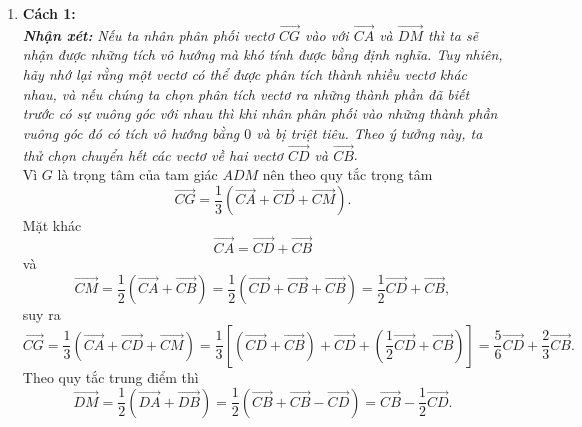 \begin{vd}
{\begin{enumerate}
			      \textbf{Cách 2:} Đặt hệ trục tọa độ $ Oxy $ vào hình vuông $ ABCD $ sao cho $ O\equiv D $, $ DC $ nằm trên tia $ Ox $ và $ DA $ nằm trên tia $ Oy $. Khi đó ta có $ D(0;0) $, $ A(0;a) $, $ B(a;a) $, $ C(a;0) $. Dễ dàng tính được $ \overrightarrow{AB}=(a;0) $; $ \overrightarrow{AD}=(0;-a) $; $ \overrightarrow{BD}=(-a;-a) $; $ \overrightarrow{BC}=(0;-a) $. Suy ra $ \overrightarrow{AB}+\overrightarrow{AD}=(a;-a) $ và $ \overrightarrow{BD}+\overrightarrow{BC}=(-a;-2a) $.\\
			      Vậy $ \left (\overrightarrow{AB}+\overrightarrow{AD}\right )\left (\overrightarrow{BD}+\overrightarrow{BC}\right )=a\cdot (-a)+(-a)\cdot(-2a)=a^2 $.
			\item \textbf{Cách 1:}\\
			      \textit{\textbf{Nhận xét:}} \textit{Nếu ta nhân phân phối vectơ $ \overrightarrow{CG} $ vào với $ \overrightarrow{CA} $ và $ \overrightarrow{DM} $ thì ta sẽ nhận được những tích vô hướng mà khó tính được bằng định nghĩa. Tuy nhiên, hãy nhớ lại rằng một vectơ có thể được phân tích thành nhiều vectơ khác nhau, và nếu chúng ta chọn phân tích vectơ ra những thành phần đã biết trước có sự vuông góc với nhau thì khi nhân phân phối vào những thành phần vuông góc đó có tích vô hướng bằng $ 0 $ và bị triệt tiêu. Theo ý tưởng này, ta thử chọn chuyển hết các vectơ về hai vectơ $ \overrightarrow{CD} $ và $ \overrightarrow{CB} $}.\\
			      Vì $ G $ là trọng tâm của tam giác $ ADM $ nên theo quy tắc trọng tâm $$ \overrightarrow{CG}=\dfrac{1}{3}\left (\overrightarrow{CA}+\overrightarrow{CD}+\overrightarrow{CM}\right ).$$
			      Mặt khác $$ \overrightarrow{CA}=\overrightarrow{CD}+\overrightarrow{CB} $$ và $$ \overrightarrow{CM}=\dfrac{1}{2}\left( \overrightarrow{CA}+\overrightarrow{CB} \right)=\dfrac{1}{2}\left( \overrightarrow{CD}+\overrightarrow{CB}+\overrightarrow{CB} \right)=\dfrac{1}{2}\overrightarrow{CD}+\overrightarrow{CB} ,$$
			      suy ra $$ \overrightarrow{CG}=\dfrac{1}{3}\left (\overrightarrow{CA}+\overrightarrow{CD}+\overrightarrow{CM}\right )=\dfrac{1}{3}\left [\left( \overrightarrow{CD}+\overrightarrow{CB}\right) +\overrightarrow{CD}+\left( \dfrac{1}{2}\overrightarrow{CD}+\overrightarrow{CB}\right)\right ] =\dfrac{5}{6}\overrightarrow{CD}+\dfrac{2}{3}\overrightarrow{CB} .$$
			      Theo quy tắc trung điểm thì $$ \overrightarrow{DM}=\dfrac{1}{2}\left( \overrightarrow{DA}+\overrightarrow{DB} \right)=\dfrac{1}{2}\left( \overrightarrow{CB}+\overrightarrow{CB}-\overrightarrow{CD} \right)=\overrightarrow{CB}-\dfrac{1}{2}\overrightarrow{CD} .$$

\end{enumerate}}
\end{vd}
